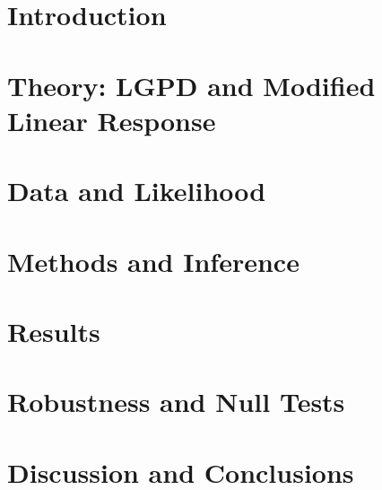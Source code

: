 \documentclass[11pt]{article}
\begin{document}
\section{Introduction}


\section{Theory: LGPD and Modified Linear Response}


\section{Data and Likelihood}


\section{Methods and Inference}


\section{Results}


\section{Robustness and Null Tests}


\section{Discussion and Conclusions}




\end{document}
